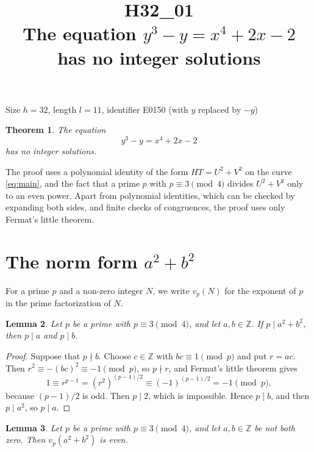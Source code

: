 \documentclass[11pt]{article}
\title{\textbf{H32\_01}\\[4pt] The equation $y^3-y=x^4+2x-2$ has no integer solutions}
\author{}
\date{}
\newtheorem{theorem}{Theorem}
\newtheorem{lemma}[theorem]{Lemma}
\newcommand{\Z}{\mathbb{Z}}
\begin{document}
\maketitle
\vspace{-8ex}
\begin{center}
Size $h=32$, length $l=11$, identifier E0150 (with $y$ replaced by $-y$)
\end{center}

\begin{theorem}\label{thm:main}
The equation
\begin{equation}\label{eq:main}
y^3-y=x^4+2x-2
\end{equation}
has no integer solutions.
\end{theorem}

The proof uses a polynomial identity of the form $HT=U^2+V^2$ on the curve \eqref{eq:main}, and the fact that a prime $p$ with $p\equiv3\pmod4$ divides $U^2+V^2$ only to an even power. Apart from polynomial identities, which can be checked by expanding both sides, and finite checks of congruences, the proof uses only Fermat's little theorem.

\section{\texorpdfstring{The norm form $a^2+b^2$}{The norm form}}

For a prime $p$ and a non-zero integer $N$, we write $v_p(N)$ for the exponent of $p$ in the prime factorization of $N$.

\begin{lemma}\label{lem:divides}
Let $p$ be a prime with $p\equiv3\pmod4$, and let $a,b\in\Z$. If $p\mid a^2+b^2$, then $p\mid a$ and $p\mid b$.
\end{lemma}

\begin{proof}
Suppose that $p\nmid b$. Choose $c\in\Z$ with $bc\equiv1\pmod p$ and put $r=ac$. Then $r^2\equiv-(bc)^2\equiv-1\pmod p$, so $p\nmid r$, and Fermat's little theorem gives
\[
1\equiv r^{p-1}=(r^2)^{(p-1)/2}\equiv(-1)^{(p-1)/2}=-1\pmod p,
\]
because $(p-1)/2$ is odd. Then $p\mid2$, which is impossible. Hence $p\mid b$, and then $p\mid a^2$, so $p\mid a$.
\end{proof}

\begin{lemma}\label{lem:even}
Let $p$ be a prime with $p\equiv3\pmod4$, and let $a,b\in\Z$ be not both zero. Then $v_p(a^2+b^2)$ is even.
\end{lemma}
\end{document}
